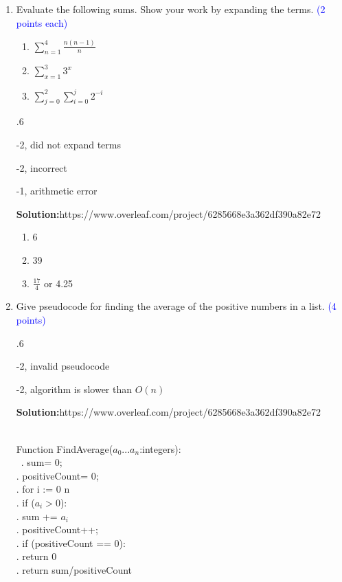 \documentclass{article}
\newcommand{\pt}[1]{\textcolor{blue}{(#1 points)}}
\newcommand{\pte}[1]{\textcolor{blue}{(#1 points each)}}
\newenvironment{solution}
{
\par
\color{blue}
\textbf{Solution:}https://www.overleaf.com/project/6285668e3a362df390a82e72
}
{
\par
}
\newenvironment{rubric}
{
\par
\begin{spacing}{.6}
\begin{itshape}
\color{red}

}
{
\end{itshape}
\end{spacing}
\par
}
\begin{document}
\begin{enumerate}
\item Evaluate the following sums. Show your work by expanding the terms. \pte{2}

\begin{enumerate}
    \item $\sum_{n=1}^{4} \frac{n(n-1)}{n}$
    \item $\sum_{x=1}^{3} 3^x$
    \item $\sum_{j=0}^{2} \sum_{i=0}^{j} 2^{-i}$
\end{enumerate}

\begin{rubric}
    -2, did not expand terms
    
    -2, incorrect
    
    -1, arithmetic error
\end{rubric}

\begin{solution}
\begin{enumerate}
    \item 6
    \item 39
    \item $\frac{17}{4}$ or 4.25
\end{enumerate}
\end{solution}

\item Give pseudocode for finding the average of the positive numbers in a list. \pt{4}

\begin{rubric}
-2, invalid pseudocode

-2, algorithm is slower than $O(n)$
\end{rubric}

\begin{solution}
    \\ Function FindAverage($a_{0}...a_{n}$:integers):\\ \ . \hspace{1pt} sum= 0;\\
    . \hspace{1pt} positiveCount= 0;\\
    . \hspace{3pt} for i := 0 \rightarrow n \\ 
    . \hspace{20pt} if ($a_{i} > 0$): \\
    . \hspace{30pt} sum += $a_{i}$ \\
    . \hspace{30pt} positiveCount++;\\
    . \hspace{1pt} if (positiveCount == 0):\\
    . \hspace{5pt} return 0\\
    . \hspace{1pt} return sum/positiveCount
    

\end{solution}
\end{enumerate}
\end{document}
